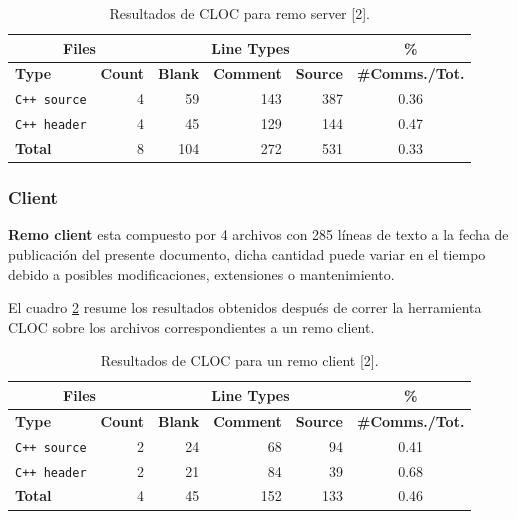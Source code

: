 \begin{table}[!htf]
    \begin{tabular}{|l|r|r|r|r|c|}
    \hline
    \multicolumn{2}{|c|}{Files} & \multicolumn{3}{|c|}{Line Types} & \hspace{0.2cm}\% \\
    \hline
    \textbf{Type} & \textbf{Count} & \textbf{Blank} & \textbf{Comment} & \textbf{Source} & \small{\textbf{\#Comms./Tot.}}\\
    \hline
    \texttt{C++ source} & 4 & 59 & 143 & 387 & 0.36 \\
    \hline
    \texttt{C++ header} & 4 & 45 & 129 & 144 & 0.47 \\
    \hline
    \textbf{Total}      & 8 & 104 & 272 & 531 & 0.33 \\
    \hline
    \end{tabular}
    \caption{Resultados de CLOC para remo server [2].}
    \label{clocServer}
\end{table}

\subsubsection{Client}
\par \textbf{Remo client} esta compuesto por 4 archivos con 285 líneas de texto a la fecha de publicación del presente documento, dicha cantidad puede variar en el tiempo debido a posibles modificaciones, extensiones o mantenimiento.

\par El cuadro \ref{clocClient} resume los resultados obtenidos después de correr la herramienta CLOC sobre los archivos correspondientes a un remo client.

\begin{table}[!htf]
    \begin{center}
    \begin{tabular}{|l|r|r|r|r|c|}
    \hline
    \multicolumn{2}{|c|}{Files} & \multicolumn{3}{|c|}{Line Types} & \hspace{0.2cm}\% \\
    \hline
    \textbf{Type} & \textbf{Count} & \textbf{Blank} & \textbf{Comment} & \textbf{Source} & \small{\textbf{\#Comms./Tot.}}\\
    \hline
    \texttt{C++ source} & 2 & 24 & 68 & 94 & 0.41 \\
    \hline
    \texttt{C++ header} & 2 & 21 & 84 & 39 & 0.68 \\
    \hline
    \textbf{Total}      & 4 & 45 & 152 & 133 & 0.46 \\
    \hline
    \end{tabular}
    \caption{Resultados de CLOC para un remo client [2].}
    \label{clocClient}
    \end{center}
\end{table}
